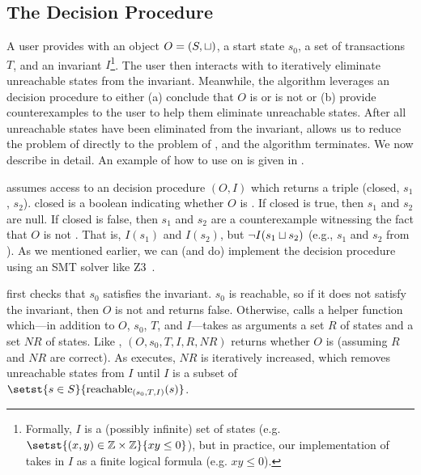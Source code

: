 \subsection{The Decision Procedure}
A user provides  with an object $O = (S,
\sqcup)$, a start state $s_0$, a set of transactions $T$, and an invariant
$I$\footnote{%
  Formally, $I$ is a (possibly infinite) set of states (e.g. $\setst{(x, y) \in
  \ints \times \ints}{xy \leq 0}$), but in practice, our implementation of
  \IsInvConfluent{} takes in $I$ as a finite logical formula (e.g. $xy \leq
  0$).
}. The user then interacts with
 to iteratively eliminate unreachable
states from the invariant. Meanwhile, the algorithm leverages an
\invariantclosure{} decision procedure to either (a) conclude that $O$ is or is
not \sTIconfluent{} or (b) provide counterexamples to the user to help them
eliminate unreachable states. After all unreachable states have been eliminated
from the invariant,  allows us to reduce
the problem of \invariantconfluence{} directly to the problem of
\invariantclosure{}, and the algorithm terminates.
%
We now describe  in detail. An example of
how to use  on  is given
in .

{}

\IsInvConfluent{} assumes access to an \invariantclosure{} decision procedure
\IsIclosed$(O, I)$ which returns a triple (closed, $s_1$, $s_2$). closed is a
boolean indicating whether $O$ is \Iclosed{}. If closed is true, then $s_1$ and
$s_2$ are null. If closed is false, then $s_1$ and $s_2$ are a counterexample
witnessing the fact that $O$ is not \Iclosed{}. That is, $I(s_1)$ and $I(s_2)$,
but $\lnot I(s_1 \sqcup s_2)$ (e.g., $s_1$ and $s_2$ from ).  As
we mentioned earlier, we can (and do) implement the \invariantclosure{}
decision procedure using an SMT solver like Z3~\cite{de2008z3}.

\IsInvConfluent{} first checks that $s_0$ satisfies the invariant. $s_0$ is
reachable, so if it does not satisfy the invariant, then $O$ is not
\sTIconfluent{} and \IsInvConfluent{} returns false. Otherwise,
\IsInvConfluent{} calls a helper function \Helper{} which---in addition to $O$,
$s_0$, $T$, and $I$---takes as arguments a set $R$ of \sTIreachable{} states
and a set $NR$ of \sTIunreachable{} states. Like \IsInvConfluent, \Helper$(O,
s_0, T, I, R, NR)$ returns whether $O$ is \sTIconfluent{} (assuming $R$ and
$NR$ are correct).  As  executes, $NR$ is
iteratively increased, which removes unreachable states from $I$ until $I$ is a
subset of $\setst{s \in S}{\sTIreachablepredicate{s}}$.

